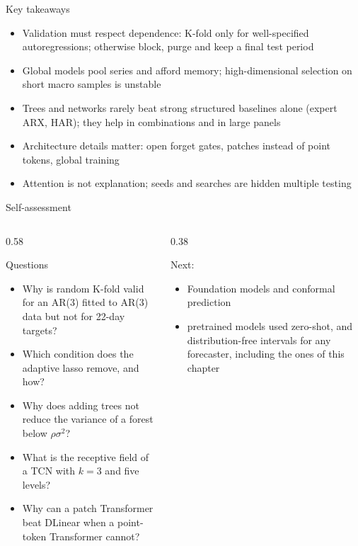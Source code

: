 \begin{frame}{Key takeaways}
\itemsize{\small}
\begin{itemize}
    \item Validation must respect dependence: K-fold only for well-specified autoregressions; otherwise block, purge and keep a final test period
    \item Global models pool series and afford memory; high-dimensional selection on short macro samples is unstable
    \item Trees and networks rarely beat strong structured baselines alone (expert ARX, HAR); they help in combinations and in large panels
    \item Architecture details matter: open forget gates, patches instead of point tokens, global training
    \item Attention is not explanation; seeds and searches are hidden multiple testing
\end{itemize}
\end{frame}

\begin{frame}{Self-assessment}
\itemsize{\small}
\begin{columns}[T]
\begin{column}{0.58\textwidth}
\begin{block}{Questions}
\begin{itemize}
    \item Why is random K-fold valid for an AR(3) fitted to AR(3) data but not for 22-day targets?
    \item Which condition does the adaptive lasso remove, and how?
    \item Why does adding trees not reduce the variance of a forest below $\rho\sigma^2$?
    \item What is the receptive field of a TCN with $k = 3$ and five levels?
    \item Why can a patch Transformer beat DLinear when a point-token Transformer cannot?
\end{itemize}
\end{block}
\end{column}
\begin{column}{0.38\textwidth}
\begin{block}{Next: }
\begin{itemize}
    \item Foundation models and conformal prediction
    \item pretrained models used zero-shot, and distribution-free intervals for any forecaster, including the ones of this chapter
\end{itemize}
\end{block}
\end{column}
\end{columns}
\end{frame}


